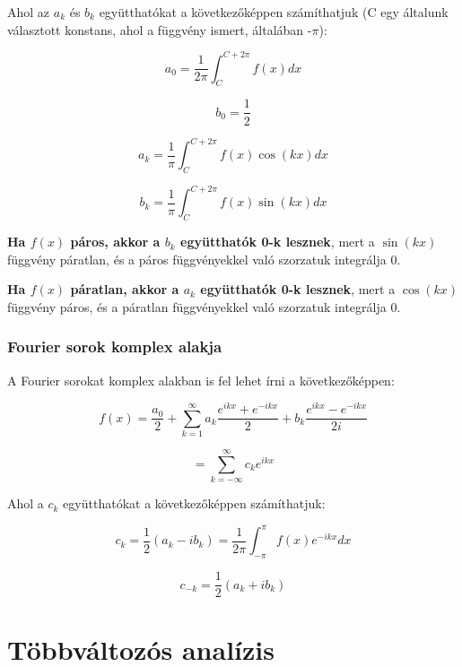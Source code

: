 \documentclass{article}
\begin{document}
Ahol az $a_k$ és $b_k$ együtthatókat a következőképpen számíthatjuk (C egy általunk választott konstans, ahol a függvény ismert, általában -$\pi$):

\begin{equation*}
    a_0 = \frac{1}{2\pi} \int_{C}^{C+2\pi} f(x) dx
\end{equation*}

\begin{equation*}
    b_0= \frac{1}{2}
\end{equation*}

\begin{equation*}
    a_k = \frac{1}{\pi} \int_{C}^{C+2\pi} f(x) \cos(kx) dx
\end{equation*}

\begin{equation*}
    b_k = \frac{1}{\pi} \int_{C}^{C+2\pi} f(x) \sin(kx) dx
\end{equation*}

\vspace{4mm}

\textbf{Ha $f(x)$ páros, akkor a $b_k$ együtthatók 0-k lesznek}, mert a $\sin(kx)$ függ\-vény páratlan, és a páros függvényekkel való szorzatuk integrálja 0.

\textbf{Ha $f(x)$ páratlan, akkor a $a_k$ együtthatók 0-k lesznek}, mert a $\cos(kx)$ függ\-vény páros, és a páratlan függvényekkel való szorzatuk integrálja 0.

\subsubsection{Fourier sorok komplex alakja}

A Fourier sorokat komplex alakban is fel lehet írni a következőképpen:

\begin{equation*}
    f(x) = \frac{a_0}{2} + \sum_{k=1}^{\infty} a_k \frac{e^{ikx} + e^{-ikx}}{2} + b_k \frac{e^{ikx} - e^{-ikx}}{2i}
\end{equation*}

\begin{equation*}
    = \sum_{k=-\infty}^{\infty} c_k e^{ikx}
\end{equation*}

Ahol a $c_k$ együtthatókat a következőképpen számíthatjuk:

\begin{equation*}
    c_k = \frac{1}{2} \left( a_k - ib_k \right) = \frac{1}{2\pi} \int_{-\pi}^{\pi} f(x) e^{-ikx} dx
\end{equation*}

\begin{equation*}
    c_{-k} = \frac{1}{2} \left( a_k + ib_k \right)
\end{equation*}

\newpage

\section{Többváltozós analízis}
\end{document}
